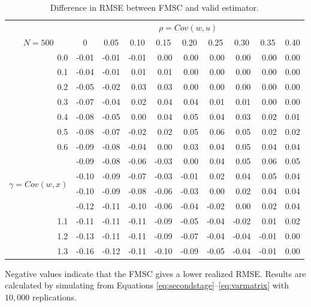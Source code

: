 \documentclass[12pt]{article}
\theoremstyle{definition}
\begin{document}
%
\begin{table}[!tbp]
\caption{Difference in RMSE between FMSC and valid estimator.}
\label{tab:rmsevsVALID}
\small
 \begin{center}
 \begin{tabular}{r|rrrrrrrrr}\hline\hline
&\multicolumn{9}{c}{$\rho = Cov(w,u)$}\\
\multicolumn{1}{c|}{$N = 500$}&\multicolumn{1}{c}{0}&\multicolumn{1}{c}{0.05}&\multicolumn{1}{c}{0.10}&\multicolumn{1}{c}{0.15}&\multicolumn{1}{c}{0.20}&\multicolumn{1}{c}{0.25}&\multicolumn{1}{c}{0.30}&\multicolumn{1}{c}{0.35}&\multicolumn{1}{c}{0.40}\tabularnewline
\hline
0.0&-0.01&-0.01&-0.01& 0.00& 0.00& 0.00& 0.00& 0.00&0.00\tabularnewline
0.1&-0.04&-0.01& 0.01& 0.01& 0.00& 0.00& 0.00& 0.00&0.00\tabularnewline
0.2&-0.05&-0.02& 0.03& 0.03& 0.00& 0.00& 0.00& 0.00&0.00\tabularnewline
0.3&-0.07&-0.04& 0.02& 0.04& 0.04& 0.01& 0.01& 0.00&0.00\tabularnewline
0.4&-0.08&-0.05& 0.00& 0.04& 0.05& 0.04& 0.03& 0.02&0.01\tabularnewline
0.5&-0.08&-0.07&-0.02& 0.02& 0.05& 0.06& 0.05& 0.02&0.02\tabularnewline
0.6&-0.09&-0.08&-0.04& 0.00& 0.03& 0.04& 0.05& 0.04&0.04\tabularnewline
\multirow{4}{5mm}{\begin{sideways}\parbox{1mm}{$\gamma\;$=$\;Cov(w,x)$}\end{sideways}}
0.7&-0.09&-0.08&-0.06&-0.03& 0.00& 0.04& 0.05& 0.06&0.05\tabularnewline
0.8&-0.10&-0.09&-0.07&-0.03&-0.01& 0.02& 0.04& 0.05&0.04\tabularnewline
0.9&-0.10&-0.09&-0.08&-0.06&-0.03& 0.00& 0.02& 0.04&0.04\tabularnewline
1.0&-0.12&-0.11&-0.10&-0.06&-0.04&-0.02& 0.00& 0.02&0.04\tabularnewline
1.1&-0.11&-0.11&-0.11&-0.09&-0.05&-0.04&-0.02& 0.01&0.02\tabularnewline
1.2&-0.13&-0.11&-0.11&-0.09&-0.07&-0.04&-0.04&-0.01&0.00\tabularnewline
1.3&-0.16&-0.12&-0.11&-0.10&-0.09&-0.05&-0.04&-0.01&0.00\tabularnewline
\hline
\end{tabular}
\end{center}
\footnotesize
\begin{tablenotes}
\item Negative values indicate that the FMSC gives a lower realized RMSE. Results are calculated by simulating from Equations \ref{eq:secondstage}--\ref{eq:varmatrix} with $10,000$ replications.
\end{tablenotes}
\end{table}
\end{document}
